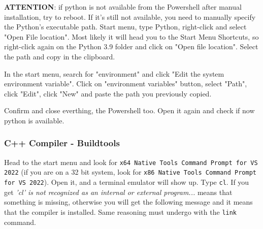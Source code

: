 \begin{warning}
	\textbf{ATTENTION}: if python is not available from the Powershell after manual installation, try to reboot. If it's still not available, you need to manually specify the Python's executable path. Start menu, type Python, right-click and select "Open File location". Most likely it will head you to the Start Menu Shortcuts, so right-click again on the Python 3.9 folder and click on "Open file location". Select the path and copy in the clipboard.

	In the start menu, search for "environment" and click "Edit the system environment variable". Click on "environment variables" button, select "Path", click "Edit", click "New" and paste the path you previously copied.

	Confirm and close everthing, the Powershell too. Open it again and check if now python is available.
\end{warning}

\subsubsection{C++ Compiler - Buildtools}
Head to the start menu and look for \texttt{x64 Native Tools Command Prompt for VS 2022} (if you are on a 32 bit system, look for \texttt{x86 Native Tools Command Prompt for VS 2022}). Open it, and a terminal emulator will show up. Type \texttt{cl}. If you get \textit{'cl' is not recognized as an internal or external program...} means that something is missing, otherwise you will get the following message and it means that the compiler is installed. Same reasoning must undergo with the \texttt{link} command.

